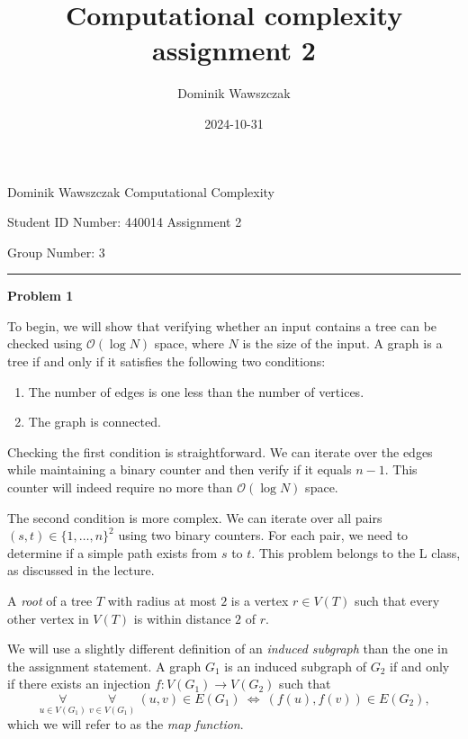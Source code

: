 \documentclass[12pt]{article}
\title{Computational complexity assignment 2}
\author{Dominik Wawszczak}
\date{2024-10-31}
\begin{document}
	\setlength{\parindent}{0 cm}
	
	Dominik Wawszczak \hfill Computational Complexity
	
	Student ID Number: 440014 \hfill Assignment 2
	
	Group Number: 3
	
	\bigskip
	\hrule
	\bigskip
	
	\textbf{Problem 1}
	
	\medskip
	
	To begin, we will show that verifying whether an input contains a tree can
	be checked using \(\mathcal{O}(\log N)\) space, where \(N\) is the size of
	the input. A graph is a tree if and only if it satisfies the following two
	conditions:
	\begin{enumerate}
		\item The number of edges is one less than the number of vertices.
		\item The graph is connected.
	\end{enumerate}
	Checking the first condition is straightforward. We can iterate over the
	edges while maintaining a binary counter and then verify if it equals
	\(n - 1\). This counter will indeed require no more than
	\(\mathcal{O}(\log N)\) space.
	
	\medskip
	
	The second condition is more complex. We can iterate over all pairs \((s, t)
	\in \{1, \ldots, n\}^{2}\) using two binary counters. For each pair, we need
	to determine if a simple path exists from \(s\) to \(t\). This problem
	belongs to the L class, as discussed in the lecture.
	
	\medskip
	
	A \textit{root} of a tree \(T\) with radius at most \(2\) is a vertex \(r
	\in V(T)\) such that every other vertex in \(V(T)\) is within distance \(2\)
	of \(r\).
	
	\medskip
	
	We will use a slightly different definition of an \textit{induced subgraph}
	than the one in the assignment statement. A graph \(G_{1}\) is an induced
	subgraph of \(G_{2}\) if and only if there exists an injection \(f :
	V(G_{1}) \to V(G_{2})\) such that
	\[ \underset{u \in V(G_{1})}{\forall} \ \underset{v \in V(G_{1})}{\forall} \
	(u, v) \in E(G_{1}) \ \iff \ (f(u), f(v)) \in E(G_{2}) \text{,} \]
	which we will refer to as the \textit{map function}.
	
	\medskip
	
\end{document}
